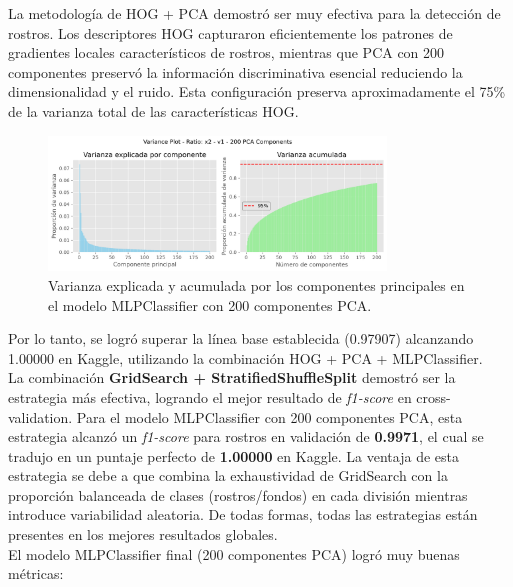 \documentclass{article}
\begin{document}
La metodología de HOG + PCA demostró ser muy efectiva para la detección de rostros. Los descriptores HOG capturaron eficientemente los patrones de gradientes locales característicos de rostros, mientras que PCA con 200 componentes preservó la información discriminativa esencial reduciendo la dimensionalidad y el ruido. Esta configuración preserva aproximadamente el 75\% de la varianza total de las características HOG.\\

\begin{figure}[H]
    \centering
    \includegraphics[width=0.8\textwidth]{tarea_5/imagenes/x2_v1_200_PCA_variance_plot.png}
    \caption{Varianza explicada y acumulada por los componentes principales en el modelo MLPClassifier con 200 componentes PCA.}
    \label{fig:pca_variance}
\end{figure}

Por lo tanto, se logró superar la línea base establecida (0.97907) alcanzando 1.00000 en Kaggle, utilizando la combinación HOG + PCA + MLPClassifier.\\

La combinación \textbf{GridSearch + StratifiedShuffleSplit} demostró ser la estrategia más efectiva, logrando el mejor resultado de \textit{f1-score} en cross-validation. Para el modelo MLPClassifier con 200 componentes PCA, esta estrategia alcanzó un \textit{f1-score} para rostros en validación de \textbf{0.9971}, el cual se tradujo en un puntaje perfecto de \textbf{1.00000} en Kaggle. La ventaja de esta estrategia se debe a que combina la exhaustividad de GridSearch con la proporción balanceada de clases (rostros/fondos) en cada división mientras introduce variabilidad aleatoria. De todas formas, todas las estrategias están presentes en los mejores resultados globales. \\

El modelo MLPClassifier final (200 componentes PCA) logró muy buenas métricas:
\end{document}
